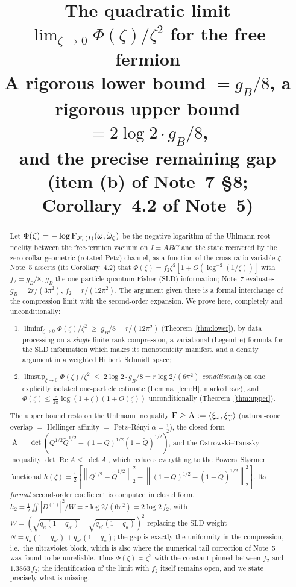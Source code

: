 \documentclass[11pt]{article}
\title{The quadratic limit \(\lim_{\zeta\to0}\Phi(\zeta)/\zeta^{2}\) for the free fermion\\[3pt]
\large A rigorous lower bound \(=g_B/8\), a rigorous upper bound \(=2\log2\cdot g_B/8\),\\
and the precise remaining gap\\[3pt]
\normalsize (item (b) of Note~7 \S8; Corollary~4.2 of Note~5)}
\author{}\date{}
\newcommand{\norm}[1]{\left\lVert #1\right\rVert}
\newcommand{\Qt}{\widetilde Q}
\newcommand{\Hell}{\operatorname{A}}
\theoremstyle{definition}\newtheorem{problem}[theorem]{Problem}
\begin{document}
\maketitle

\begin{abstract}\noindent
Let \(\Phi(\zeta)=-\log\operatorname{F}_{\mathcal F_r(I)}(\omega,\widetilde\omega_\zeta)\) be the negative logarithm of
the Uhlmann root fidelity between the free-fermion vacuum on \(I=ABC\) and the state recovered by the
zero-collar geometric (rotated Petz) channel, as a function of the cross-ratio variable \(\zeta\).
Note~5 asserts (its Corollary~4.2) that \(\Phi(\zeta)=f_2\zeta^2[1+O(\log^{-2}(1/\zeta))]\) with
\(f_2=g_B/8\), \(g_B\) the one-particle quantum Fisher (SLD) information; Note~7 evaluates
\(g_B=2r/(3\pi^2)\), \(f_2=r/(12\pi^2)\).  The argument given there is a formal interchange of the
compression limit with the second-order expansion.  We prove here, completely and unconditionally:
\begin{enumerate}[label=(\roman*),leftmargin=2.2em]
\item \(\displaystyle\liminf_{\zeta\to0}\Phi(\zeta)/\zeta^2\;\ge\;g_B/8=r/(12\pi^2)\)
      (Theorem~\ref{thm:lower}), by data processing on a \emph{single} finite-rank compression, a
      variational (Legendre) formula for the SLD information which makes its monotonicity manifest,
      and a density argument in a weighted Hilbert--Schmidt space;
\item \(\displaystyle\limsup_{\zeta\to0}\Phi(\zeta)/\zeta^{2}\;\le\;2\log 2\cdot g_B/8
      =r\log2/(6\pi^2)\) \emph{conditionally} on one explicitly isolated one-particle estimate
      (Lemma~\ref{lem:H}, marked \textsc{gap}), and \(\Phi(\zeta)\le\frac r{2\pi}\log(1+\zeta)(1+O(\zeta))\)
      unconditionally (Theorem~\ref{thm:upper}).
\end{enumerate}
The upper bound rests on the Uhlmann inequality \(\Fid\ge\Hell:=\langle\xi_\omega,\xi_{\widetilde\omega}\rangle\)
(natural-cone overlap \(=\) Hellinger affinity \(=\) Petz--R\'enyi \(\alpha=\frac12\)), the closed form
\(\Hell=\det(Q^{1/2}\Qt^{1/2}+(1-Q)^{1/2}(1-\Qt)^{1/2})\), and the Ostrowski--Taussky inequality
\(\det\operatorname{Re}A\le|\det A|\), which reduces everything to the Powers--St\o rmer functional
\(h(\zeta)=\frac12[\norm{Q^{1/2}-\Qt^{1/2}}_2^2+\norm{(1-Q)^{1/2}-(1-\Qt)^{1/2}}_2^2]\).  Its
\emph{formal} second-order coefficient is computed in closed form,
\(h_2=\frac12\iint|D^{(1)}|^2/W=r\log2/(6\pi^2)=2\log2\,f_2\), with
\(W=(\sqrt{q_\kappa(1-q_{\kappa'})}+\sqrt{q_{\kappa'}(1-q_\kappa)})^2\) replacing the SLD weight
\(N=q_\kappa(1-q_{\kappa'})+q_{\kappa'}(1-q_\kappa)\); the gap is exactly the uniformity in the
compression, i.e.\ the ultraviolet block, which is also where the numerical tail correction of
Note~5 was found to be unreliable.  Thus \(\Phi(\zeta)\asymp\zeta^2\) with the constant pinned
between \(f_2\) and \(1.3863\,f_2\); the identification of the limit with \(f_2\) itself remains
open, and we state precisely what is missing.
\end{abstract}
\end{document}
